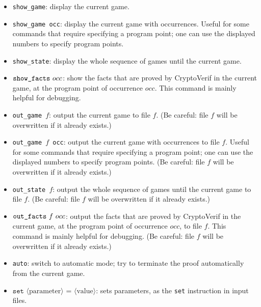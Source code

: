 \documentclass{article}
\newcommand{\nonterm}[1]{\langle\textrm{#1}\rangle}
\begin{document}
\begin{itemize}
\item \texttt{show\string_game}: display the current game.

\item \texttt{show\string_game occ}: display the current game with
  occurrences. Useful for some commands that require specifying a
  program point; one can use the displayed numbers to specify program
  points.

\item \texttt{show\string_state}: display the whole sequence
of games until the current game.

\item $\texttt{show\string_facts}\ occ$: show the facts that are proved
by CryptoVerif in the current game, at the program point of occurrence $occ$. 
This command is mainly helpful for debugging.

\item \texttt{out\string_game $f$}: output the current game to file $f$.
  (Be careful: file $f$ will be overwritten if it already exists.)

\item \texttt{out\string_game $f$ occ}: output the current game with
  occurrences to file $f$. Useful for some commands that require specifying a
  program point; one can use the displayed numbers to specify program
  points.
  (Be careful: file $f$ will be overwritten if it already exists.)

\item \texttt{out\string_state $f$}: output the whole sequence
of games until the current game to file $f$.
  (Be careful: file $f$ will be overwritten if it already exists.)

\item $\texttt{out\string_facts}\ f\ occ$: output the facts that are proved
  by CryptoVerif in the current game, at the program point of occurrence $occ$,
  to file $f$. 
This command is mainly helpful for debugging.
  (Be careful: file $f$ will be overwritten if it already exists.)

\item \texttt{auto}: switch to automatic mode; try to
terminate the proof automatically from the current game.

\item $\texttt{set }\nonterm{parameter}\texttt{ = }\nonterm{value}$:
sets parameters, as the \texttt{set} instruction in input files.


\end{itemize}
\end{document}
